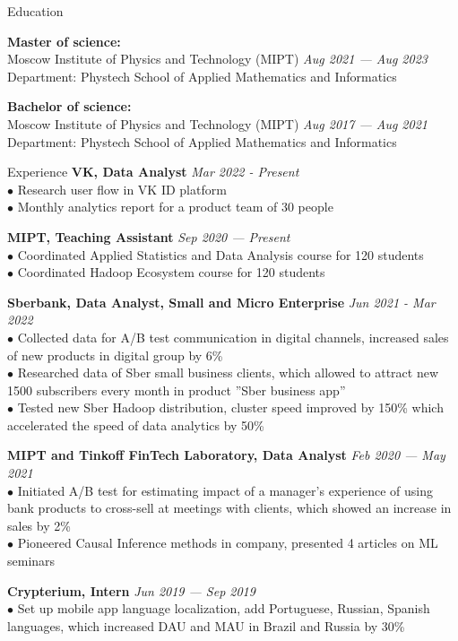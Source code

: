 \documentclass{resume} %
\begin{document}
\begin{rSection}{ Education }

{\bf Master of science:} \\
{Moscow Institute of Physics and Technology (MIPT)} \hfill {\em Aug 2021 — Aug 2023} \\ 
{Department:} {Phystech School of Applied Mathematics and Informatics}

{\bf Bachelor of science:} \\
{Moscow Institute of Physics and Technology (MIPT)} \hfill {\em Aug 2017 — Aug 2021} \\ 
{Department:} {Phystech School of Applied Mathematics and Informatics}

\end{rSection}

\begin{rSection}{ Experience }
    { \bf VK, Data Analyst} \hfill {\em Mar 2022 - Present}\\
    { $\bullet$ Research user flow in VK ID platform } \\
    { $\bullet$ Monthly analytics report for a product team of 30 people }
    
    { \bf MIPT, Teaching Assistant} \hfill {\em Sep 2020 — Present}\\
    { $\bullet$ Coordinated Applied Statistics and Data Analysis course for 120 students } \\
    { $\bullet$ Coordinated Hadoop Ecosystem course for 120 students }

    { \bf Sberbank, Data Analyst, Small and Micro Enterprise} \hfill {\em Jun 2021 - Mar 2022}\\
    { $\bullet$ Collected data for A/B test communication in digital channels, increased sales of new products in digital group by 6\% }\\
    { $\bullet$ Researched data of Sber small business clients, which allowed to attract new 1500 subscribers every month in product ''Sber business app'' }\\
    { $\bullet$ Tested new Sber Hadoop distribution, cluster speed improved by 150\% which accelerated the speed of data analytics by 50\%}
    
    { \bf MIPT and Tinkoff FinTech Laboratory, Data Analyst } \hfill {\em Feb 2020 — May 2021}\\
    { $\bullet$ Initiated A/B test for estimating impact of a manager's experience of using bank products to cross-sell at meetings with clients, which showed an increase in sales by 2\% }\\
    { $\bullet$ Pioneered Causal Inference methods in company, presented 4 articles on ML seminars  }
        
    { \bf Crypterium, Intern} \hfill {\em Jun 2019 — Sep 2019}\\
    { $\bullet$ Set up mobile app language localization, add Portuguese, Russian, Spanish languages, which increased DAU and MAU in Brazil and Russia by 30\%}\\

\end{rSection}
\end{document}
